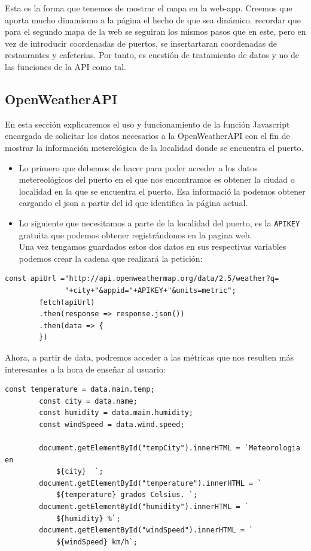 \documentclass{article}
\begin{document}
Esta es la forma que tenemos de mostrar el mapa en la web-app. Creemos que aporta mucho dinamismo a la página el hecho de que sea dinámico. recordar que para el segundo mapa de la web se seguiran los mismos pasos que en este, pero en vez de introducir coordenadas de puertos, se insertartaran coordenadas de restaurantes y cafeterias. Por tanto, es cuestión de tratamiento de datos y no de las funciones de la API como tal.
\subsection{OpenWeatherAPI}
En esta sección explicaremos el uso y funcionamiento de la función Javascript encargada de solicitar los datos necesarios a la OpenWeatherAPI con el fin de mostrar la información meterelógica de la localidad donde se encuentra el puerto.
\begin{itemize}
    \item Lo primero que debemos de hacer para poder acceder a los datos metereológicos del puerto en el que nos encontramos es obtener la ciudad o localidad en la que se encuentra el puerto. Esa informació la podemos obtener cargando el json a partir del id que identifica la página actual.
    \item Lo siguiente que necesitamos a parte de la localidad del puerto, es la \texttt{APIKEY} gratuita que podemos obtener registrándonos en la pagina web.\\

Una vez tengamos guardados estos dos datos en sus respectivas variables podemos crear la cadena que realizará la petición:
\end{itemize}

\begin{verbatim}
const apiUrl ="http://api.openweathermap.org/data/2.5/weather?q=
              "+city+"&appid="+APIKEY+"&units=metric";
        fetch(apiUrl)
        .then(response => response.json())
        .then(data => {
        })
\end{verbatim}

\noindent Ahora, a partir de data, podremos acceder a las métricas que nos resulten más interesantes a la hora de enseñar al usuario:
\begin{verbatim}
const temperature = data.main.temp;
        const city = data.name;
        const humidity = data.main.humidity;
        const windSpeed = data.wind.speed;

        document.getElementById("tempCity").innerHTML = `Meteorologia en 
            ${city}  `;
        document.getElementById("temperature").innerHTML = `
            ${temperature} grados Celsius. `;
        document.getElementById("humidity").innerHTML = `
            ${humidity} %`;
        document.getElementById("windSpeed").innerHTML = `
            ${windSpeed} km/h`;
\end{verbatim}
\end{document}
